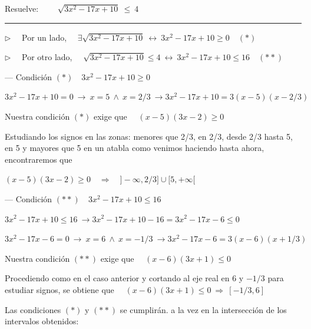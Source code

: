 \begin{miejercicio}

Resuelve: $\qquad \sqrt{3x^2-17x+10} \ \leqslant\ 4$

\rule{250pt}{0.1pt}

\vspace{4mm} $\triangleright \quad$ Por un lado, $\quad \exists 	\sqrt{3x^2-17x+10}  \ \leftrightarrow \ 3x^2-17x+10 \geqslant 0 \quad (*)$

\vspace{2mm} $\triangleright \quad$ Por otro lado, $\quad  	\sqrt{3x^2-17x+10}\leqslant 4  \ \leftrightarrow \ 3x^2-17x+10  \leqslant 16 \quad (**)$

\vspace{4mm} --- Condición $(*) \quad 3x^2-17x+10 \geqslant 0 $

\vspace{2mm} $3x^2-17x+10=0 \ \to \ x=5 \ \wedge \ x=2/3 \ \to 3x^2-17x+10=3(x-5)(x-2/3)$

\vspace{2mm} Nuestra condición $(*)$ exige que $\quad (x-5)(3x-2)\geqslant 0$

\vspace{2mm} Estudiando los signos en las zonas: menores que 2/3, en 2/3, desde 2/3 hasta 5, en 5 y mayores que 5 en un atabla como venimos haciendo hasta ahora, encontraremos que 

\vspace{2mm} $(x-5)(3x-2)\geqslant 0 \quad \Rightarrow \quad ]-\infty, 2/3]\cup[5,+\infty[$

\vspace{4mm} --- Condición $(**)\quad 3x^2-17x+10  \leqslant 16$

\vspace{2mm} $3x^2-17x+10  \leqslant 16 \ \to 3x^2-17x+10-16 =3x^2-17x-6 \leqslant 0$

\vspace{2mm} $3x^2-17x-6=0 \ \to \ x=6 \ \wedge \ x=-1/3 \ \to 3x^2-17x-6=3(x-6)(x+1/3)$

\vspace{2mm} Nuestra condición $(**)$ exige que $\quad (x-6)(3x+1)\leqslant 0$

\vspace{2mm} Procediendo como en el caso anterior y cortando al eje real en $6$ y $-1/3$ para estudiar signos, se obtiene que
$\quad (x-6)(3x+1)\leqslant 0 \ \Rightarrow \ [-1/3,6]$

\vspace{4mm} Las condiciones $(*)$ y $(**)$ se cumplirán. a la vez en la intersección de los intervalos obtenidos:


\end{miejercicio}

